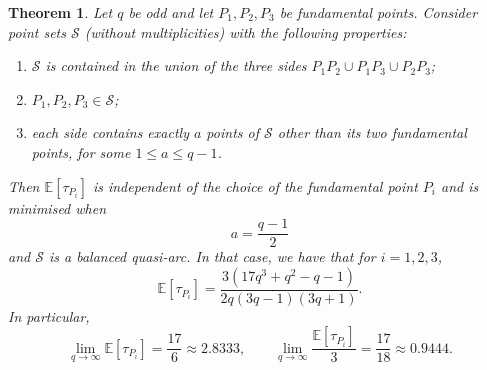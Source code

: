\documentclass{article}
\newtheorem{theorem}{Theorem}
\begin{document}
\begin{theorem}
\label{thm:optimal-simple-side-configuration}
Let $q$ be odd and let $P_1,P_2,P_3$ be fundamental points. Consider point
sets $\mathcal S$ (without multiplicities) with the following properties:
\begin{enumerate}
\item $\mathcal S$ is contained in the union of the three sides
      $P_1P_2\cup P_1P_3\cup P_2P_3$;
\item $P_1,P_2,P_3\in\mathcal S$;
\item each side contains exactly $a$ points of $\mathcal S$ other than
      its two fundamental points, for some $1\leq a\leq q-1$.
\end{enumerate}
Then $\mathbb E[\tau_{P_i}]$ is independent of the choice of the fundamental point $P_i$ and is
minimised when
\[
a=\frac{q-1}{2}
\]
and $\mathcal S$ is a balanced quasi-arc.
In that case, we have that for $i=1,2,3$,
\begin{equation}
\mathbb E[\tau_{P_i}]
 =\frac{3(17q^3+q^2-q-1)}{2q(3q-1)(3q+1)}.
\end{equation}
In particular,
\[
\lim_{q\to\infty}\mathbb E[\tau_{P_i}]=\frac{17}{6}\approx 2.8333,
\qquad
\lim_{q\to\infty}\frac{\mathbb E[\tau_{P_i}]}{3}=\frac{17}{18}\approx 0.9444.
\]
\end{theorem}
\end{document}

